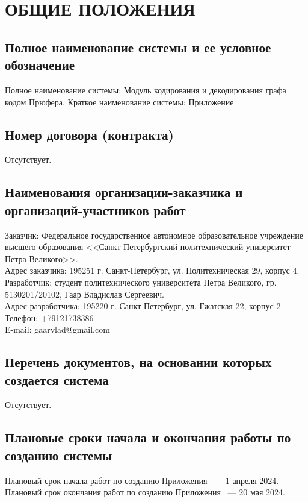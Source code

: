 \documentclass[12pt,a4paper]{article}
\begin{document}
\section{ОБЩИЕ ПОЛОЖЕНИЯ}
\subsection{Полное наименование системы и ее условное обозначение}
Полное наименование системы: Модуль кодирования и декодирования графа кодом Прюфера.\newline
\medskip Краткое наименование системы: Приложение.

\subsection{Номер договора (контракта)}
Отсутствует.

\subsection{Наименования организации-заказчика и организаций-участников работ}
Заказчик: Федеральное государственное автономное образовательное учреждение высшего образования <<Санкт-Петербургский политехнический университет Петра Великого>>. \\
Адрес заказчика: 195251 г. Санкт-Петербург, ул. Политехническая 29, корпус 4.
\newline
\newline
Разработчик: студент политехнического университета Петра Великого, гр. 5130201/20102, Гаар Владислав Сергеевич. \\
Адрес разработчика: 195220 г. Санкт-Петербург, ул. Гжатская 22, корпус 2. \\
Телефон: +79121738386\\
E-mail: gaarvlad@gmail.com

\subsection{Перечень документов, на основании которых создается система}
Отсутствует.

\subsection{Плановые сроки начала и окончания работы по созданию системы}\label{time}
Плановый срок начала работ по созданию Приложения \, --- 1 апреля 2024.  \\
Плановый срок окончания работ по созданию Приложения \, --- 20 мая 2024. 
\end{document}

